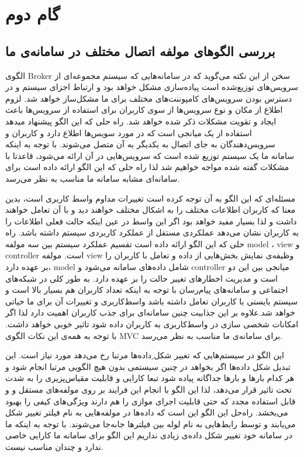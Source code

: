 \chapter{گام دوم}\label{chap:2}
\section{بررسی ‌الگوهای مولفه اتصال مختلف در سامانه‌ی ما}


الگوی ‌‌Broker سخن از این نکته می‌گوید که در سامانه‌هایی که سیستم مجموعه‌ای از سرویس‌های توزیع‌شده است  پیاده‌سازی مشکل خواهد بود و ارتباط  اجزای سیستم و در دسترس بودن سرویس‌های کامپوننت‌های مختلف برای ما مشکل‌ساز خواهد شد. لزوم اطلاع از مکان و نوع سرویس‌ها از سوی  کاربران  برای استفاده از سرویس‌ها باعث ایجاد و تقویت مشکلات ذکر شده خواهد شد. راه حلی که این الگو پیشنهاد میدهد استفاده از یک میانجی است که در مورد سویس‌ها اطلاع دارد و کاربران و سرویس‌دهندگان به جای اتصال به یکدیگر به آن متصل می‌شوند. با توجه به اینکه سامانه ما یک سیستم توزیع شده است که سرویس‌هایی در آن ارائه می‌شود، قاعدتا با مشکلات گفته شده مواجه خواهیم شد لذا راه حلی که این الگو  ارائه داده است  برای سامانه‌ای مشابه سامانه ما مناسب به نظر می‌رسد.




مسئله‌ای که این الگو به آن توجه کرده است تغییرات مداوم واسط کاربری است، بدین معنا که کاربران اطلاعات مختلف را به اشکال مختلف خواهند دید و با آن تعامل خواهند داشت و لذا بسیار  مفید خواهد بود اگر این واسط در عین اینکه  حالت فعلی اطلاعات را به کاربران نشان می‌دهد عملکردی مستقل از عملکرد کاربردی سیستم داشته باشد. راه حلی که این الگو ارائه داده است تقسیم عملکرد سیستم بین سه مولفه model ، view و controller است. مولفه view وظیفه‌ی نمایش بخش‌هایی از داده و تعامل با کاربران را بر عهده دارد، model شامل داده‌های سامانه می‌شود و controller میانجی بین این دو است و مدیریت اخطارهای تغییر حالت را بر عهده دارد. به طور کلی در شبکه‌های اجتماعی و سامانه‌های پیام‌رسان با توجه به اینکه تعداد کاربران هم بسیار بالا است و سیستم بایستی با کاربران تعامل داشته باشد واسط‌کاربری و تغییرات آن برای ما حیاتی خواهد شد.علاوه بر این جذابیت چنین سامانه‌ای برای جذب کاربران اهمیت دارد لذا اگر امکانات شخصی سازی در  واسط‌کاربری به کاربران داده شود تاثیر خوبی خواهد داشت. با توجه به همه‌ی این نکات الگوی MVC برای سامانه‌ی ما مناسب به نظر می‌رسد.



این الگو در سیستم‌هایی که تغییر شکل ِداده‌ها مرتبا رخ می‌دهد مورد نیاز است. این تبدیل شکل داده‌ها اگر بخواهد در چنین سیستمی بدون هیچ الگویی مرتبا انجام شود و هر کدام بارها و بارها جداگانه پیاده شود تبعا کارایی و قابلیت مقیاس‌پزیری را به شدت تحت تاثیر قرار می‌دهد، لذا این الگو با انجام این فرایند بر روی مولفه‌های مستقل   و و قابل استفاده مجدد که حتی قابلیت اجرای موازی را هم دارند ویژگی‌های کیفی را بهبود می‌بخشد. راه‌حل این الگو این است که داده‌ها در مولفه‌هایی به نام فیلتر تغییر شکل می‌یابند و توسط رابط‌هایی به نام لوله‌ بین فیلترها جابه‌جا می‌شوند. با توجه به اینکه ما در سامانه خود تغییر شکل‌‌‌ داده‌ی زیادی نداریم این الگو برای سامانه ما کارایی خاصی ندارد و چندان مناسب نیست.



